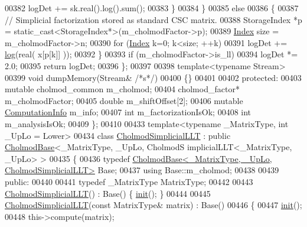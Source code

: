 \begin{DoxyCode}
00382           logDet += sk.real().log().sum();
00383         \}
00384       \}
00385       \textcolor{keywordflow}{else}
00386       \{
00387         \textcolor{comment}{// Simplicial factorization stored as standard CSC matrix.}
00388         StorageIndex *p = \textcolor{keyword}{static\_cast<}StorageIndex*\textcolor{keyword}{>}(m\_cholmodFactor->p);
00389         \hyperlink{namespace_eigen_a62e77e0933482dafde8fe197d9a2cfde}{Index} size = m\_cholmodFactor->n;
00390         \textcolor{keywordflow}{for} (\hyperlink{namespace_eigen_a62e77e0933482dafde8fe197d9a2cfde}{Index} k=0; k<size; ++k)
00391           logDet += \hyperlink{structlog}{log}(real( x[p[k]] ));
00392       \}
00393       \textcolor{keywordflow}{if} (m\_cholmodFactor->is\_ll)
00394         logDet *= 2.0;
00395       \textcolor{keywordflow}{return} logDet;
00396     \};
00397 
00398     \textcolor{keyword}{template}<\textcolor{keyword}{typename} Stream>
00399     \textcolor{keywordtype}{void} dumpMemory(Stream& \textcolor{comment}{/*s*/})
00400     \{\}
00401     
00402   \textcolor{keyword}{protected}:
00403     \textcolor{keyword}{mutable} cholmod\_common m\_cholmod;
00404     cholmod\_factor* m\_cholmodFactor;
00405     \textcolor{keywordtype}{double} m\_shiftOffset[2];
00406     \textcolor{keyword}{mutable} \hyperlink{group__enums_ga85fad7b87587764e5cf6b513a9e0ee5e}{ComputationInfo} m\_info;
00407     \textcolor{keywordtype}{int} m\_factorizationIsOk;
00408     \textcolor{keywordtype}{int} m\_analysisIsOk;
00409 \};
00410 
00433 \textcolor{keyword}{template}<\textcolor{keyword}{typename} \_MatrixType, \textcolor{keywordtype}{int} \_UpLo = Lower>
00434 \textcolor{keyword}{class }\hyperlink{class_eigen_1_1_cholmod_simplicial_l_l_t}{CholmodSimplicialLLT} : \textcolor{keyword}{public} \hyperlink{class_eigen_1_1_cholmod_base}{CholmodBase}<\_MatrixType, \_UpLo, CholmodS
      implicialLLT<\_MatrixType, \_UpLo> >
00435 \{
00436     \textcolor{keyword}{typedef} \hyperlink{class_eigen_1_1_cholmod_base}{CholmodBase<\_MatrixType, \_UpLo, CholmodSimplicialLLT>}
       Base;
00437     \textcolor{keyword}{using} Base::m\_cholmod;
00438     
00439   \textcolor{keyword}{public}:
00440     
00441     \textcolor{keyword}{typedef} \_MatrixType MatrixType;
00442     
00443     \hyperlink{class_eigen_1_1_cholmod_simplicial_l_l_t}{CholmodSimplicialLLT}() : Base() \{ \hyperlink{structinit}{init}(); \}
00444 
00445     \hyperlink{class_eigen_1_1_cholmod_simplicial_l_l_t}{CholmodSimplicialLLT}(\textcolor{keyword}{const} MatrixType& matrix) : Base()
00446     \{
00447       \hyperlink{structinit}{init}();
00448       this->compute(matrix);

\end{DoxyCode}
